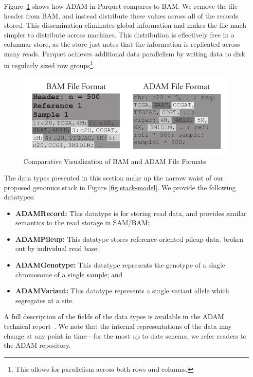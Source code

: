 \documentclass{bioinfo}
\begin{document}
\begin{methods}
Figure~\ref{fig:file-format} shows how ADAM in Parquet compares to BAM. We remove the file header from BAM,
and instead distribute these values across all of the records stored. This dissemination eliminates global information and makes the file much
simpler to distribute across machines. This distribution is effectively free in a columnar store, as the store just notes that the information is
replicated across many reads. Parquet achieves additional data parallelism by writing data to disk in regularly sized row groups\footnote{This
allows for parallelism across both rows and columns.}.

\begin{figure}[h]
\begin{center}
\includegraphics[width=\linewidth]{file-format.pdf}
\end{center}
\caption{Comparative Visualization of BAM and ADAM File Formats}
\label{fig:file-format}
\end{figure}

The data types presented in this section make up the narrow waist of our proposed genomics stack in Figure \ref{fig:stack-model}. We provide
the following datatypes:

\begin{itemize}
\item \textbf{ADAMRecord:} This datatype is for storing read data, and provides similar semantics to the read storage in SAM/BAM;
\item \textbf{ADAMPileup:} This datatype stores reference-oriented pileup data, broken out by individual read base;
\item \textbf{ADAMGenotype:} This datatype represents the genotype of a single chromosome of a single sample; and
\item \textbf{ADAMVariant:} This datatype represents a single variant allele which segregates at a site.
\end{itemize}

A full description of the fields of the data types is available in the ADAM technical report~\citep[see][\S5]{massie13}. We note that the internal
representations of the data may change at any point in time---for the most up to date schema, we refer readers to the ADAM repository.


\end{methods}
\end{document}

